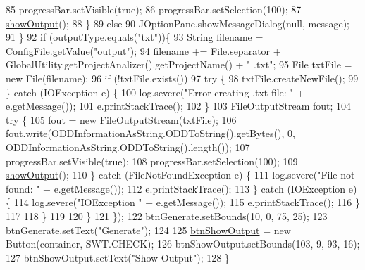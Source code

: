 \begin{DoxyCode}
85                         progressBar.setVisible(\textcolor{keyword}{true});
86                         progressBar.setSelection(100);
87                         \hyperlink{classit_1_1isislab_1_1masonhelperdocumentation_1_1mason_1_1wizards_1_1_q___end_wizard_a944a5732f2c5ba72de80c4bd014c3afb}{showOutput}();
88                     \}
89                     \textcolor{keywordflow}{else}
90                         JOptionPane.showMessageDialog(null, message);
91                 \}
92                 \textcolor{keywordflow}{if} (outputType.equals(\textcolor{stringliteral}{"txt"}))\{
93                     String filename = ConfigFile.getValue(\textcolor{stringliteral}{"output"});
94                     filename += File.separator + GlobalUtility.getProjectAnalizer().getProjectName() + \textcolor{stringliteral}{"
      .txt"};
95                     File txtFile = \textcolor{keyword}{new} File(filename);
96                     \textcolor{keywordflow}{if} (!txtFile.exists())
97                         \textcolor{keywordflow}{try} \{
98                             txtFile.createNewFile();                            
99                         \} \textcolor{keywordflow}{catch} (IOException e) \{
100                             log.severe(\textcolor{stringliteral}{"Error creating .txt file: "} + e.getMessage());
101                             e.printStackTrace();
102                         \}
103                     FileOutputStream fout;
104                     \textcolor{keywordflow}{try} \{
105                         fout = \textcolor{keyword}{new} FileOutputStream(txtFile);
106                         fout.write(ODDInformationAsString.ODDToString().getBytes(), 0, 
      ODDInformationAsString.ODDToString().length());
107                         progressBar.setVisible(\textcolor{keyword}{true});
108                         progressBar.setSelection(100);
109                         \hyperlink{classit_1_1isislab_1_1masonhelperdocumentation_1_1mason_1_1wizards_1_1_q___end_wizard_a944a5732f2c5ba72de80c4bd014c3afb}{showOutput}();
110                     \} \textcolor{keywordflow}{catch} (FileNotFoundException e) \{
111                         log.severe(\textcolor{stringliteral}{"File not found: "} + e.getMessage());
112                         e.printStackTrace();
113                     \} \textcolor{keywordflow}{catch} (IOException e) \{
114                         log.severe(\textcolor{stringliteral}{"IOException "} + e.getMessage());
115                         e.printStackTrace();
116                     \}
117                     
118                 \}   
119                 
120             \}
121         \});
122         btnGenerate.setBounds(10, 0, 75, 25);
123         btnGenerate.setText(\textcolor{stringliteral}{"Generate"});
124         
125         \hyperlink{classit_1_1isislab_1_1masonhelperdocumentation_1_1mason_1_1wizards_1_1_q___end_wizard_adabc78dc53c9ffd3c77d6e453db02cb6}{btnShowOutput} = \textcolor{keyword}{new} Button(container, SWT.CHECK);
126         btnShowOutput.setBounds(103, 9, 93, 16);
127         btnShowOutput.setText(\textcolor{stringliteral}{"Show Output"});
128     \}
\end{DoxyCode}


